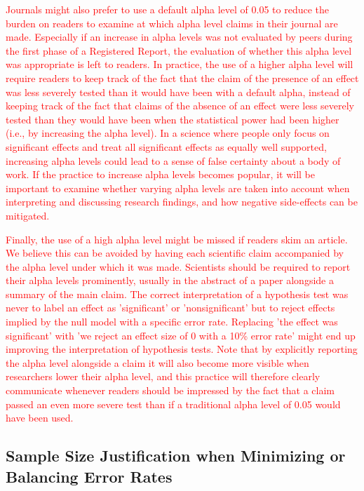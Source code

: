 \documentclass[
  english,
  ,man, a4paper,floatsintext]{apa6}
\begin{document}
\textcolor{red}{Journals might also prefer to use a default alpha level of 0.05 to reduce the burden on readers to examine at which alpha level claims in their journal are made. Especially if an increase in alpha levels was not evaluated by peers during the first phase of a Registered Report, the evaluation of whether this alpha level was appropriate is left to readers. In practice, the use of a higher alpha level will require readers to keep track of the fact that the claim of the presence of an effect was less severely tested than it would have been with a default alpha, instead of keeping track of the fact that claims of the absence of an effect were less severely tested than they would have been when the statistical power had been higher (i.e., by increasing the alpha level). In a science where people only focus on significant effects and treat all significant effects as equally well supported, increasing alpha levels could lead to a sense of false certainty about a body of work. If the practice to increase alpha levels becomes popular, it will be important to examine whether varying alpha levels are taken into account when interpreting and discussing research findings, and how negative side-effects can be mitigated.}

\textcolor{red}{Finally, the use of a high alpha level might be missed if readers skim an article. We believe this can be avoided by having each scientific claim accompanied by the alpha level under which it was made. Scientists should be required to report their alpha levels prominently, usually in the abstract of a paper alongside a summary of the main claim. The correct interpretation of a hypothesis test was never to label an effect as 'significant' or 'nonsignificant' but to reject effects implied by the null model with a specific error rate. Replacing 'the effect was significant' with 'we reject an effect size of 0 with a 10\% error rate' might end up improving the interpretation of hypothesis tests. Note that by explicitly reporting the alpha level alongside a claim it will also become more visible when researchers lower their alpha level, and this practice will therefore clearly communicate whenever readers should be impressed by the fact that a claim passed an even more severe test than if a traditional alpha level of 0.05 would have been used.}

\hypertarget{sample-size-justification-when-minimizing-or-balancing-error-rates}{%
\subsection{Sample Size Justification when Minimizing or Balancing Error Rates}\label{sample-size-justification-when-minimizing-or-balancing-error-rates}}
\end{document}
